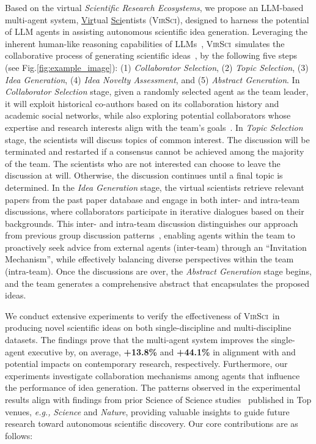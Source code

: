 \documentclass[11pt]{article}
\def\modelname{\textsc{VirSci\xspace}}
\def\fig{Fig.\xspace}
\begin{document}
Based on the virtual \textit{Scientific Research Ecosystems}, we propose an LLM-based multi-agent system, \underline{Vir}tual \underline{Sci}entists (\modelname), designed to harness the potential of LLM agents in assisting autonomous scientific idea generation. Leveraging the inherent human-like reasoning capabilities of LLMs~\citep{xie2024can}, \modelname\ simulates the collaborative process of generating scientific ideas~\citep{perry2017creativity,muzzio2024collaborative}, by the following five steps (see \fig\ref{fig:example_image}):
(1) \textit{Collaborator Selection},
(2) \textit{Topic Selection},
(3) \textit{Idea Generation},
(4) \textit{Idea Novelty Assessment}, and
(5) \textit{Abstract Generation}.
In \textit{Collaborator Selection} stage, given a randomly selected agent as the team leader, it will exploit historical co-authors based on its collaboration history and academic social networks, while also exploring potential collaborators whose expertise and research interests align with the team's goals~\cite{march1991exploration,rzhetsky2015choosing,zeng2019increasing}.
In \textit{Topic Selection} stage, the scientists will discuss topics of common interest. The discussion will be terminated and restarted if a consensus cannot be achieved among the majority of the team. The scientists who are not interested can choose to leave the discussion at will. Otherwise, the discussion continues until a final topic is determined.
In the \textit{Idea Generation} stage, the virtual scientists retrieve relevant papers from the past paper database and engage in both inter- and intra-team discussions, where collaborators participate in iterative dialogues based on their backgrounds. This inter- and intra-team discussion distinguishes our approach from previous group discussion patterns~\cite{zhang2023exploring,qi2024large,qian2024chat}, enabling agents within the team to proactively seek advice from external agents (inter-team) through an ``Invitation Mechanism'', while effectively balancing diverse perspectives within the team (intra-team). 
Once the discussions are over, the \textit{Abstract Generation} stage begins, and the team generates a comprehensive abstract that encapsulates the proposed ideas.

We conduct extensive experiments to verify the effectiveness of \modelname\ in producing novel scientific ideas on both single-discipline and multi-discipline datasets.
The findings prove that the multi-agent system improves the single-agent executive by, on average, \textbf{+13.8\%} and \textbf{+44.1\%} in alignment with and potential impacts on contemporary research, respectively.
Furthermore, our experiments investigate collaboration mechanisms among agents that influence the performance of idea generation. The patterns observed in the experimental results align with findings from prior Science of Science studies~\citep{fortunato2018science, wu2019large, zeng2021fresh, shi2023surprising} published in Top venues, \emph{e.g.,} \textit{Science} and \textit{Nature}, providing valuable insights to guide future research toward autonomous scientific discovery.
Our core contributions are as follows:
\end{document}
